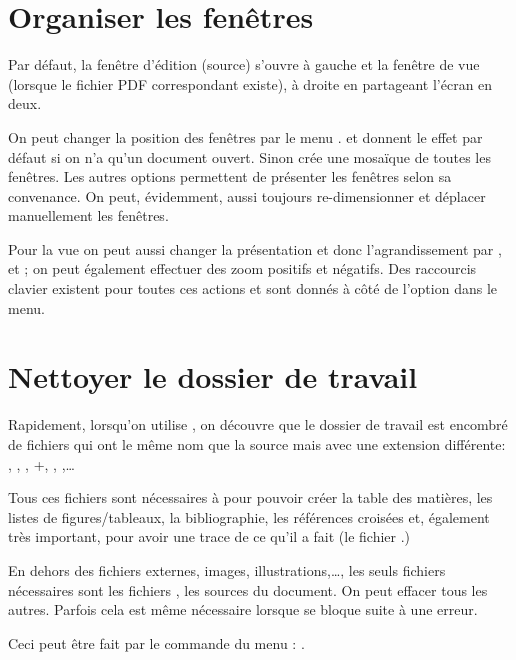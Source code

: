 \section{Organiser les fenêtres}

Par défaut, la fenêtre d'édition (source) s'ouvre à gauche et la fenêtre de vue (lorsque le fichier PDF correspondant existe), à droite en partageant l'écran en deux.

On peut changer la position des fenêtres par le menu . \submenu{} et \submenu{} donnent le effet par défaut si on n'a qu'un document ouvert. Sinon \submenu{} crée une mosaïque de toutes les fenêtres. Les autres options permettent de présenter les fenêtres selon sa convenance. On peut, évidemment, aussi toujours re-dimensionner et déplacer manuellement les fenêtres.

Pour la vue on peut aussi changer la présentation et donc l'agrandissement par \submenu{}, \submenu{} et \submenu{}; on peut également effectuer des zoom positifs et négatifs. Des raccourcis clavier existent pour toutes ces actions et sont donnés à côté de l'option dans le menu.

\section{Nettoyer le dossier de travail}
\label{sec:remove-aux-files}

Rapidement, lorsqu'on utilise \AllTeX, on découvre que le dossier de travail est encombré de fichiers qui ont le même nom que la source mais avec une extension différente: , , , +, , ,\dots

Tous ces fichiers sont nécessaires à \AllTeX{} pour pouvoir créer la table des matières, les listes de figures/tableaux, la bibliographie, les références croisées et, également très important, pour avoir une trace de ce qu'il a fait (le fichier .)

En dehors des fichiers externes, images, illustrations,\dots , les seuls fichiers nécessaires sont les fichiers , les sources du document. On peut effacer tous les autres. Parfois cela est même nécessaire lorsque \AllTeX{} se bloque suite à une erreur.

Ceci peut être fait par le commande \Tw{} du menu : \submenu{}.

